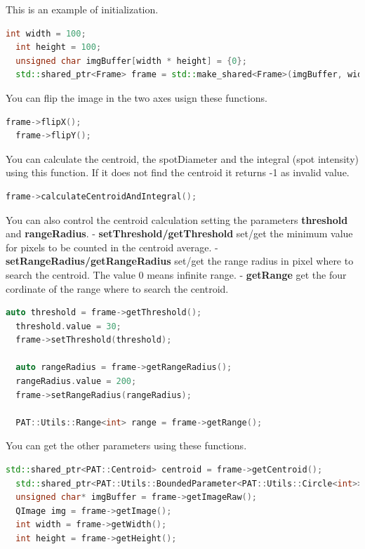 This is an example of initialization.

\begin{lstlisting}[language=c++, gobble=2]
  int width = 100;
  int height = 100;
  unsigned char imgBuffer[width * height] = {0};
  std::shared_ptr<Frame> frame = std::make_shared<Frame>(imgBuffer, width, height, QImage::Format_Grayscale8);
\end{lstlisting}

You can flip the image in the two axes usign these functions.

\begin{lstlisting}[language=c++, gobble=2]
  frame->flipX();
  frame->flipY();
\end{lstlisting}

You can calculate the centroid, the spotDiameter and the integral (spot
intensity) using this function. If it does not find the centroid it
returns -1 as invalid value.

\begin{lstlisting}[language=c++, gobble=2]
  frame->calculateCentroidAndIntegral();
\end{lstlisting}

You can also control the centroid calculation setting the parameters
\textbf{threshold} and \textbf{rangeRadius}. -
\textbf{setThreshold/getThreshold} set/get the minimum value for pixels
to be counted in the centroid average. -
\textbf{setRangeRadius/getRangeRadius} set/get the range radius in pixel
where to search the centroid. The value 0 means infinite range. -
\textbf{getRange} get the four cordinate of the range where to search
the centroid.

\begin{lstlisting}[language=c++, gobble=2]
  auto threshold = frame->getThreshold();
  threshold.value = 30;
  frame->setThreshold(threshold);
  
  auto rangeRadius = frame->getRangeRadius();
  rangeRadius.value = 200;
  frame->setRangeRadius(rangeRadius);
  
  PAT::Utils::Range<int> range = frame->getRange();
\end{lstlisting}

You can get the other parameters using these functions.

\begin{lstlisting}[language=c++, gobble=2]
  std::shared_ptr<PAT::Centroid> centroid = frame->getCentroid();
  std::shared_ptr<PAT::Utils::BoundedParameter<PAT::Utils::Circle<int>>> target = frame->getTarget();
  unsigned char* imgBuffer = frame->getImageRaw();
  QImage img = frame->getImage();
  int width = frame->getWidth();
  int height = frame->getHeight();
\end{lstlisting}

